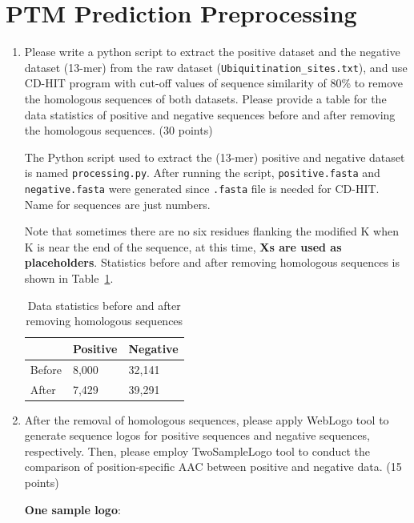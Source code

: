 \documentclass{article}
\begin{document}
\section{PTM Prediction Preprocessing}
\begin{enumerate}
    \item Please write a python script to extract the positive dataset and the negative dataset (13-mer) from the raw dataset (\texttt{Ubiquitination\_sites.txt}), and use CD-HIT program with cut-off values of sequence similarity of 80\% to remove the homologous sequences of both datasets. Please provide a table for the data statistics of positive and negative sequences before and after removing the homologous sequences. (30 points)
    
    The Python script used to extract the (13-mer) positive and negative dataset is named \texttt{processing.py}. After running the script, \texttt{positive.fasta} and \texttt{negative.fasta} were generated since \texttt{.fasta} file is needed for CD-HIT. Name for sequences are just numbers. 
    
    Note that sometimes there are no six residues flanking the modified K when K is near the end of the sequence, at this time, \textbf{Xs are used as placeholders}. Statistics before and after removing homologous sequences is shown in Table~\ref{tab:statistics}. 

    \begin{table}[htbp]
        \centering\begin{tabular}{lll}
            \hline
            & Positive & Negative \\ \hline
     Before & 8,000    & 32,141   \\
     After  & 7,429    & 39,291   \\ \hline
     \end{tabular}
        \caption{Data statistics before and after removing homologous sequences}
        \label{tab:statistics}
    \end{table}

    \item After the removal of homologous sequences, please apply WebLogo tool to generate sequence logos for positive sequences and negative sequences, respectively. Then, please employ TwoSampleLogo tool to conduct the comparison of position-specific AAC between positive and negative data. (15 points)
    
    \textbf{One sample logo}:
    

\end{enumerate}
\end{document}
